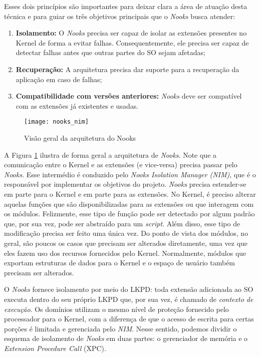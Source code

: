 Esses dois princípios são importantes para deixar clara a área de atuação desta
técnica e para guiar os três objetivos principais que o \emph{Nooks} busca
atender:

\begin{enumerate}
	\item \textbf{Isolamento:} O \emph{Nooks} precisa ser capaz de isolar as
				extensões presentes no Kernel de forma a evitar falhas. Consequentemente,
				ele precisa ser capaz de detectar falhas antes que outras partes do
				SO sejam afetadas;
	\item \textbf{Recuperação:} A arquitetura precisa dar suporte para a
				recuperação da aplicação em caso de falhas;
	\item \textbf{Compatibilidade com versões anteriores:} \emph{Nooks} deve ser
				compatível com as extensões já existentes e usadas.
\end{enumerate}

\begin{figure}[!h]
  \centering
  \texttt{[image: nooks\_nim]}
	\caption[Visão geral da arquitetura do Nooks]{Visão geral da arquitetura do Nooks \citep{nooks}}
  \label{fig:nooks_nim}
\end{figure}

A Figura \ref{fig:nooks_nim} ilustra de forma geral a arquitetura de
\emph{Nooks}. Note que a comunicação entre o Kernel e as extensões (e vice-versa)
precisa passar pelo \emph{Nooks}. Esse intermédio é conduzido pelo \emph{Nooks
Isolation Manager (NIM)}, que é o responsável por implementar os objetivos do
projeto. \emph{Nooks} precisa estender-se em parte para o Kernel e em parte
para as extensões. No Kernel, é preciso alterar aquelas funções que são
disponibilizadas para as extensões ou que interagem com os módulos. Felizmente,
esse tipo de função pode ser detectado por algum padrão que, por sua vez, pode
ser abstraído para um \emph{script}. Além disso, esse tipo de modificação precisa ser
feito uma única vez. Do ponto de vista dos módulos, no geral, são poucos os
casos que precisam ser alterados diretamente, uma vez que eles fazem uso dos
recursos fornecidos pelo Kernel. Normalmente, módulos que exportam estruturas
de dados para o Kernel e o espaço de usuário também precisam ser alterados.

O \emph{Nooks} fornece isolamento por meio do LKPD: toda extensão
adicionada ao SO executa dentro do seu próprio LKPD que, por sua vez, é chamado
de \emph{contexto de execução}. Os domínios utilizam o mesmo nível de proteção
fornecido pelo processador para o Kernel, com a diferença de que o acesso de
escrita para certas porções é limitada e gerenciada pelo \emph{NIM}. Nesse
sentido, podemos dividir o esquema de isolamento de \emph{Nooks} em duas partes:
o gerenciador de memória e o \emph{Extension Procedure Call} (XPC).

